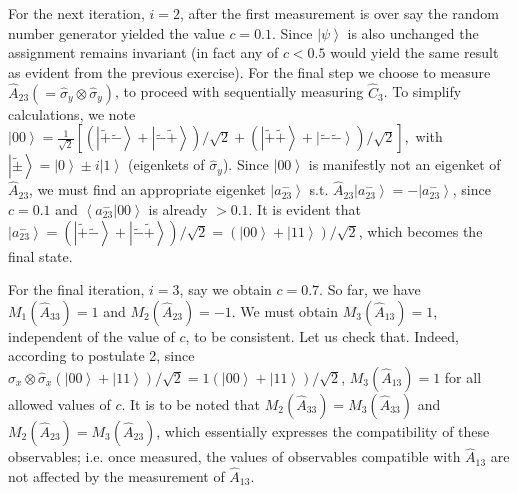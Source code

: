 \documentclass[british,aps,prl,superscriptaddress,nofootinbib,times,reprint]{revtex4-1}
\theoremstyle{plain}
\theoremstyle{plain}
\theoremstyle{definition}
\theoremstyle{remark}
\theoremstyle{remark}
\theoremstyle{remark}
\theoremstyle{plain}
\theoremstyle{plain}
\theoremstyle{plain}
\theoremstyle{definition}
\theoremstyle{definition}
\begin{document}
For the next iteration, $i=2$, 
after the first measurement is over
say the random number generator yielded the value $c=0.1$.
Since $\left|\psi\right\rangle $ is also
unchanged
the assignment remains invariant (in fact any of
$c<0.5$ would yield the same result as
evident from the previous exercise). For the
final step we choose to measure
$\hat{A}_{23}(=\hat{\sigma}_{y}\otimes\hat{\sigma}_{y})$,
to proceed with sequentially measuring
$\hat{C}_{3}$. To simplify calculations, we note
$\left|00\right\rangle
=\frac{1}{\sqrt 2} \left[ \left(\left|\tilde{+}\tilde{-}\right\rangle
+\left|\tilde{-}\tilde{+}\right\rangle
\right)/\sqrt{2}+\left(\left|\tilde{+}\tilde{+}\right\rangle
+\left|\tilde{-}\tilde{-}\right\rangle
\right)/\sqrt{2}\right] , 
$
with
$\left|\tilde{\pm}\right\rangle
=\left|0\right\rangle \pm i\left|1\right\rangle $
(eigenkets of $\hat{\sigma}_{y}$). Since
$\left|00\right\rangle$ is manifestly not an
eigenket of $\hat A_{23}$, we must find an appropriate
eigenket $\left|a^-_{23}\right\rangle $ s.t.
$\hat A_{23}\left|a^{-}_{23}\right\rangle
=-\left|a^{-}_{23}\right\rangle $, since $c=0.1$ and
$\left\langle a_{23}^{-}|00\right\rangle $ is already
$>0.1$. It is evident that
$\left|a^{-}_{23}\right\rangle
=\left(\left|\tilde{+}\tilde{-}\right\rangle
+\left|\tilde{-}\tilde{+}\right\rangle
\right)/\sqrt{2}=\left(\left|00\right\rangle
+\left|11\right\rangle \right)/\sqrt{2}$, which
becomes the final state. 


For the final
iteration, $i=3$, say we obtain $c=0.7$. So far,
we have $M_{1}(\hat{A}_{33})=1$ and
$M_{2}(\hat{A}_{23})=-1$. We must obtain
$M_{3}(\hat{A}_{13})=1$, independent of the value
of $c$, to be consistent. Let us check that.
Indeed, according to postulate 2, since
$\hat{\sigma}_{x}\otimes\hat{\sigma}_{x}\left(\left|00\right\rangle
+\left|11\right\rangle
\right)/\sqrt{2}=1\left(\left|00\right\rangle
+\left|11\right\rangle \right)/\sqrt{2}$,
$M_{3}(\hat{A}_{13})=1$ for all allowed values of
$c$. It is to be noted that
$M_{2}(\hat{A}_{33})=M_{3}(\hat{A}_{33})$ and
$M_{2}(\hat{A}_{23})=M_{3}(\hat{A}_{23})$, which
essentially expresses the compatibility of these
observables; i.e. 
once measured, the values of observables compatible
with $\hat{A}_{13}$ are not affected by the 
measurement of $\hat{A}_{13}$.
\end{document}
